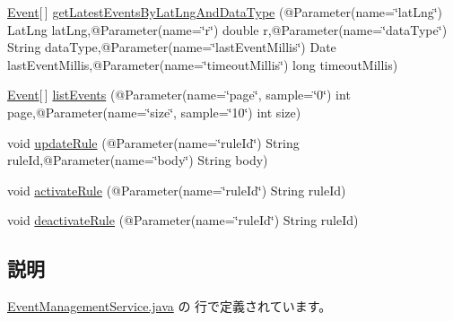 \begin{DoxyCompactItemize}
\item 
\hyperlink{classjp_1_1ac_1_1kyoto__u_1_1i_1_1soc_1_1ai_1_1iostbase_1_1service_1_1intf_1_1_event}{Event}\mbox{[}$\,$\mbox{]} \hyperlink{interfacejp_1_1ac_1_1kyoto__u_1_1i_1_1soc_1_1ai_1_1iostbase_1_1service_1_1intf_1_1_event_management_service_aeff776e7cc93b1321d7869d6602fea5d}{get\-Latest\-Events\-By\-Lat\-Lng\-And\-Data\-Type} (@Parameter(name=\char`\"{}lat\-Lng\char`\"{}) Lat\-Lng lat\-Lng,@Parameter(name=\char`\"{}r\char`\"{}) double r,@Parameter(name=\char`\"{}data\-Type\char`\"{}) String data\-Type,@Parameter(name=\char`\"{}last\-Event\-Millis\char`\"{}) Date last\-Event\-Millis,@Parameter(name=\char`\"{}timeout\-Millis\char`\"{}) long timeout\-Millis)
\item 
\hyperlink{classjp_1_1ac_1_1kyoto__u_1_1i_1_1soc_1_1ai_1_1iostbase_1_1service_1_1intf_1_1_event}{Event}\mbox{[}$\,$\mbox{]} \hyperlink{interfacejp_1_1ac_1_1kyoto__u_1_1i_1_1soc_1_1ai_1_1iostbase_1_1service_1_1intf_1_1_event_management_service_ad2d72f8be42d38450a68c644226ed220}{list\-Events} (@Parameter(name=\char`\"{}page\char`\"{}, sample=\char`\"{}0\char`\"{}) int page,@Parameter(name=\char`\"{}size\char`\"{}, sample=\char`\"{}10\char`\"{}) int size)
\item 
void \hyperlink{interfacejp_1_1ac_1_1kyoto__u_1_1i_1_1soc_1_1ai_1_1iostbase_1_1service_1_1intf_1_1_event_management_service_adb32b9ef6fa58fbef094d62834dce19f}{update\-Rule} (@Parameter(name=\char`\"{}rule\-Id\char`\"{}) String rule\-Id,@Parameter(name=\char`\"{}body\char`\"{}) String body)
\item 
void \hyperlink{interfacejp_1_1ac_1_1kyoto__u_1_1i_1_1soc_1_1ai_1_1iostbase_1_1service_1_1intf_1_1_event_management_service_a0effe63c1f32145090730a6cdf09f62e}{activate\-Rule} (@Parameter(name=\char`\"{}rule\-Id\char`\"{}) String rule\-Id)
\item 
void \hyperlink{interfacejp_1_1ac_1_1kyoto__u_1_1i_1_1soc_1_1ai_1_1iostbase_1_1service_1_1intf_1_1_event_management_service_a989f340ce1813adba306577617cf19e6}{deactivate\-Rule} (@Parameter(name=\char`\"{}rule\-Id\char`\"{}) String rule\-Id)
\end{DoxyCompactItemize}


\subsection{説明}


 \hyperlink{_event_management_service_8java_source}{Event\-Management\-Service.\-java} の  行で定義されています。



